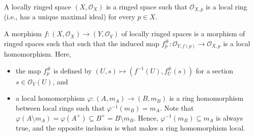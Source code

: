 A locally ringed space $(X, \mathcal{O}_X)$ is a ringed space such that
$\mathcal{O}_{X, p}$ is a local ring (i.e., has a unique maximal
ideal) for every $p \in X$.

A morphism $f\colon (X, \mathcal{O}_X)\to (Y, \mathcal{O}_Y)$ of locally ringed spaces is a morphism of ringed spaces such that
such that the induced map $f_p^\#\colon \mathcal{O}_{Y, f(p)} \to \mathcal{O}_{X, p}$ is a local
homomorphism. Here,
\begin{itemize}
	\item the map $f_p^\#$ is defined by $(U, s)\mapsto (f^{-1}(U), f^\#_U(s))$ for
		a section $s \in \mathcal{O}_Y(U)$, and
	\item a local homomorphism $\varphi\colon (A, m_A)\to (B, m_B)$ is a ring homomorphism between local rings such that
		$\varphi^{-1}(m_B) = m_A$. Note that $\varphi(A\setminus m_A) = \varphi(A^\times) \subseteq B^\times = B\setminus m_B$.
		Hence, $\varphi^{-1}(m_B) \subseteq m_A$ is always true, and the opposite
		inclusion is what makes a ring homomorphism local.
\end{itemize}
